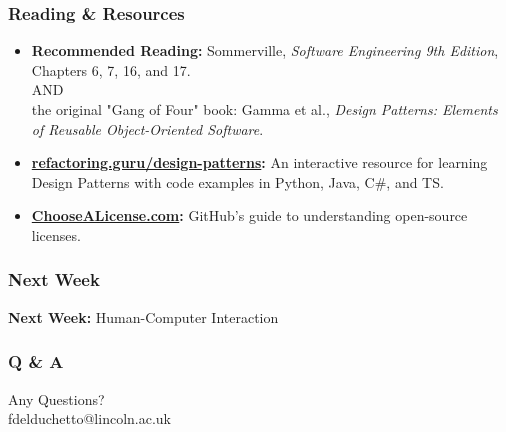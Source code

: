 \documentclass[xcolor=table]{beamer}
\begin{document}
    

\begin{frame}
    \frametitle{Reading \& Resources}
    \begin{itemize}
        \item \textbf{Recommended Reading:} 
        Sommerville, \textit{Software Engineering 9th Edition}, Chapters 6, 7, 16, and 17.\\ AND\\the original "Gang of Four" book: Gamma et al., \textit{Design Patterns: Elements of Reusable Object-Oriented Software}.
        \item \textbf{\href{https://refactoring.guru/design-patterns}{refactoring.guru/design-patterns}:} An interactive resource for learning Design Patterns with code examples in Python, Java, C\#, and TS.
        \item \textbf{\href{https://choosealicense.com}{ChooseALicense.com}:} GitHub's guide to understanding open-source licenses.
    \end{itemize}
\end{frame}

\begin{frame}
    \frametitle{Next Week}
    \begin{center}
     \textbf{Next Week:} Human-Computer Interaction 
    \end{center}
\end{frame}

\begin{frame}
    \frametitle{Q \& A}
    \begin{center}
        \Huge Any Questions?\\\vspace{0.5cm} 
        \normalsize fdelduchetto@lincoln.ac.uk
    \end{center}
\end{frame}
\end{document}
